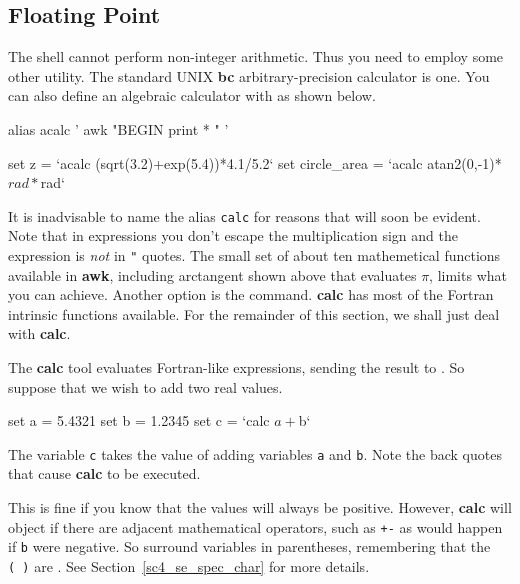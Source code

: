 \documentclass[twoside,11pt,nolof]{starlink}
\providecommand{\latexelsehtml}[2]{#1}
\providecommand{\KAPPAref}{\xref{{\footnotesize KAPPA}}{sun95}{}}
\begin{document}
\newpage
\subsection{Floating Point\label{sc4_se_real}}

The shell cannot perform non-integer arithmetic.  Thus you need to
employ some other utility.  The standard UNIX \textbf{bc}
arbitrary-precision calculator is one.  You can also define
an algebraic calculator with  as shown
below.

\begin{small}
\begin{terminalv}
     alias acalc '       awk "BEGIN{ print \!* }" '

     set z = `acalc (sqrt(3.2)+exp(5.4))*4.1/5.2`
     set circle_area = `acalc atan2(0,-1)*${rad}*${rad}`
\end{terminalv}
\end{small}
It is inadvisable to name the alias \texttt{calc} for reasons that will
soon be evident.  Note that in expressions you don't escape the
multiplication sign and the expression is \emph{not} in {\texttt{"}} quotes.
The small set of about ten mathemetical functions available in {\bf
awk}, including arctangent shown above that evaluates $\pi$, limits
what you can achieve.  Another option is the {\KAPPAref}  command.  \textbf{calc} has most of the Fortran
intrinsic functions available.  For the remainder of this section, we
shall just deal with \textbf{calc}.

The \textbf{calc} tool evaluates Fortran-like expressions, sending the
result to .  So suppose
that we wish to add two real values.

\begin{small}
\begin{terminalv}
     set a = 5.4321
     set b = 1.2345
     set c = `calc $a+$b`
\end{terminalv}
\end{small}
The variable \texttt{c} takes the value of adding variables \texttt{a} and
\texttt{b}.  Note the back quotes that cause \textbf{calc} to be executed.

This is fine if you know that the values will always be positive.
However, \textbf{calc} will object if there are adjacent mathematical
operators, such as \texttt{+-} as would happen if \texttt{b} were negative.
So surround variables in parentheses, remembering that the \texttt{(~)} are
.
\latexelsehtml{See Section~\ref{sc4_se_spec_char}}{Click
\htmlref{here}{sc4_se_spec_char}} for more details.
\end{document}
